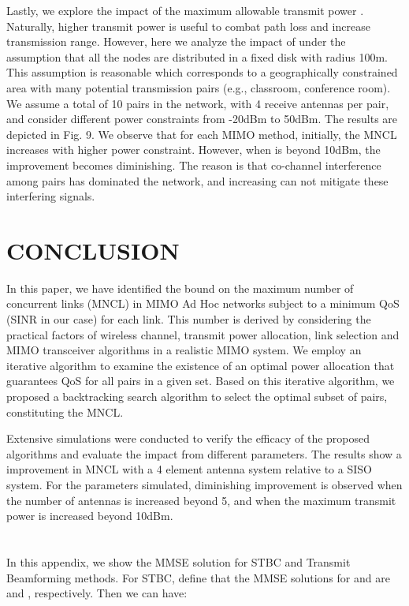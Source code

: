 \documentclass[draftcls,onecolumn,peerview,12pt]{IEEEtran}
\begin{document}
Lastly, we explore the impact of the maximum allowable transmit
power . Naturally, higher transmit power is useful to combat
path loss and increase transmission range. However, here we analyze
the impact of  under the assumption that all the nodes are
distributed in a fixed disk with radius 100m. This assumption is
reasonable which corresponds to a geographically constrained area
with many potential transmission pairs (e.g., classroom, conference
room). We assume a total of 10 pairs in the network, with 4 receive
antennas per pair, and consider different power constraints from
-20dBm to 50dBm. The results are depicted in Fig. 9. We observe that
for each MIMO method, initially, the MNCL increases with higher
power constraint. However, when  is beyond 10dBm, the
improvement becomes diminishing. The reason is that co-channel
interference among pairs has dominated the network, and increasing
 can not mitigate these interfering signals.



\section{CONCLUSION}
In this paper, we have identified the bound on the maximum number of
concurrent links (MNCL) in MIMO Ad Hoc networks subject to a minimum
QoS (SINR in our case) for each link. This number is derived by
considering the practical factors of wireless channel, transmit
power allocation, link selection and MIMO transceiver algorithms in
a realistic MIMO system. We employ an iterative algorithm to examine
the existence of an optimal power allocation that guarantees QoS for
all pairs in a given set. Based on this iterative algorithm, we
proposed a backtracking search algorithm to select the optimal
subset of pairs, constituting the MNCL.

Extensive simulations were conducted to verify the efficacy of the
proposed algorithms and evaluate the impact from different
parameters. The results show a  improvement in MNCL with a
4 element antenna system relative to a SISO system. For the
parameters simulated, diminishing improvement is observed when the
number of antennas is increased beyond 5, and when the maximum
transmit power is increased beyond 10dBm.

\appendices
\section{}
In this appendix, we show the MMSE solution for STBC and Transmit
Beamforming methods. For STBC, define that the MMSE solutions for
 and  are  and , respectively. Then we can have:
\end{document}
